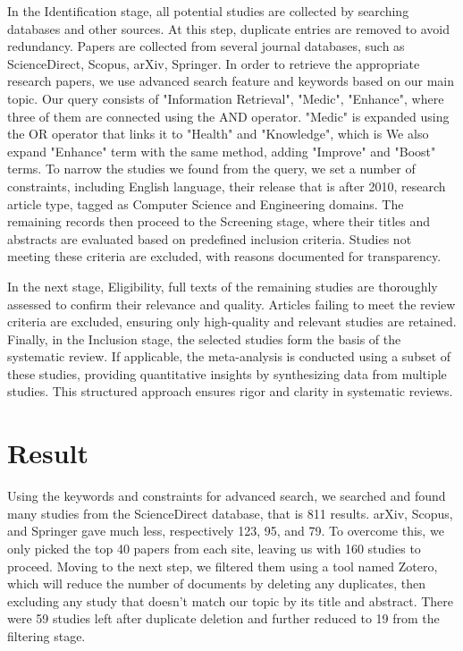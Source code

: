 \documentclass[conference]{IEEEtran}
\begin{document}
In the Identification stage, all potential studies are collected by searching databases and other sources. At this step, duplicate entries are removed to avoid redundancy. Papers are collected from several journal databases, such as ScienceDirect, Scopus, arXiv, Springer. In order to retrieve the appropriate research papers, we use advanced search feature and keywords based on our main topic. Our query consists of "Information Retrieval", "Medic", "Enhance", where three of them are connected using the AND operator. "Medic" is expanded using the OR operator that links it to "Health" and "Knowledge", which is We also expand "Enhance" term with the same method, adding "Improve" and "Boost" terms. To narrow the studies we found from the query, we set a number of constraints, including English language, their release that is after 2010, research article type, tagged as Computer Science and Engineering domains. The remaining records then proceed to the Screening stage, where their titles and abstracts are evaluated based on predefined inclusion criteria. Studies not meeting these criteria are excluded, with reasons documented for transparency.

In the next stage, Eligibility, full texts of the remaining studies are thoroughly assessed to confirm their relevance and quality. Articles failing to meet the review criteria are excluded, ensuring only high-quality and relevant studies are retained. Finally, in the Inclusion stage, the selected studies form the basis of the systematic review. If applicable, the meta-analysis is conducted using a subset of these studies, providing quantitative insights by synthesizing data from multiple studies. This structured approach ensures rigor and clarity in systematic reviews.

\section{Result}

Using the keywords and constraints for advanced search, we searched and found many studies from the ScienceDirect database, that is 811 results. arXiv, Scopus, and Springer gave much less, respectively 123, 95, and 79. To overcome this, we only picked the top 40 papers from each site, leaving us with 160 studies to proceed. Moving to the next step, we filtered them using a tool named Zotero, which will reduce the number of documents by deleting any duplicates, then excluding any study that doesn't match our topic by its title and abstract. There were 59 studies left after duplicate deletion and further reduced to 19 from the filtering stage.
\end{document}
